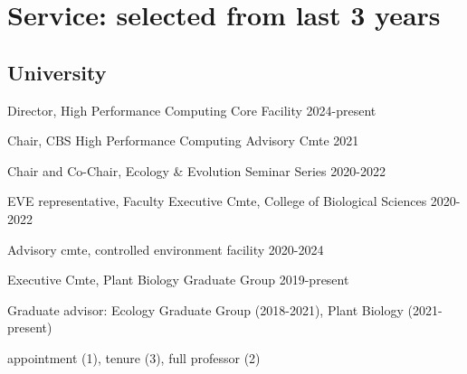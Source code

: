 \documentclass[letterpaper,10pt]{article}
\newcommand{\ignore}[1]{}
\renewenvironment{itemize}{
  \begin{list}{}{
    \setlength{\leftmargin}{1.5em}
  }
}{
  \end{list}
}
\begin{document}
\section*{Service: selected from last 3 years}
\begin{itemize}
\setlength\itemsep{0ex}
\subsection*{University}
\item Director, High Performance Computing Core Facility \hfill 2024-present
\item Chair, CBS High Performance Computing Advisory Cmte \hfill 2021
\item Chair and Co-Chair, Ecology \& Evolution Seminar Series \hfill 2020-2022
\item EVE representative, Faculty Executive Cmte, College of Biological Sciences \hfill 2020-2022
\item Advisory cmte, controlled environment facility \hfill 2020-2024
\item Executive Cmte, Plant Biology Graduate Group \hfill 2019-present
\item Graduate advisor: Ecology Graduate Group (2018-2021), Plant Biology (2021-present)
\item \ignore{Todesco 2022} appointment (1), \ignore {Mandel 2023, Cornejo 2022, Hodgins 2023} tenure (3), \ignore{Lowry 2023, Hernandez 2021} full professor (2) %

\end{itemize}
\end{document}
